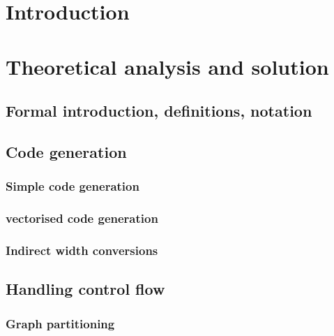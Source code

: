 \chapter{Introduction}
  
\chapter{Theoretical analysis and solution}

    \label{ch:analysis}

    \section{Formal introduction, definitions, notation} 

    \pagebreak
    \section{Code generation} \label{sec:codegeneration}

        \subsection{Simple code generation}  %

        \subsection{vectorised code generation} 

        \subsection{Indirect width conversions} 

    \pagebreak
    \section{Handling control flow} 

        \subsection{Graph partitioning} 

